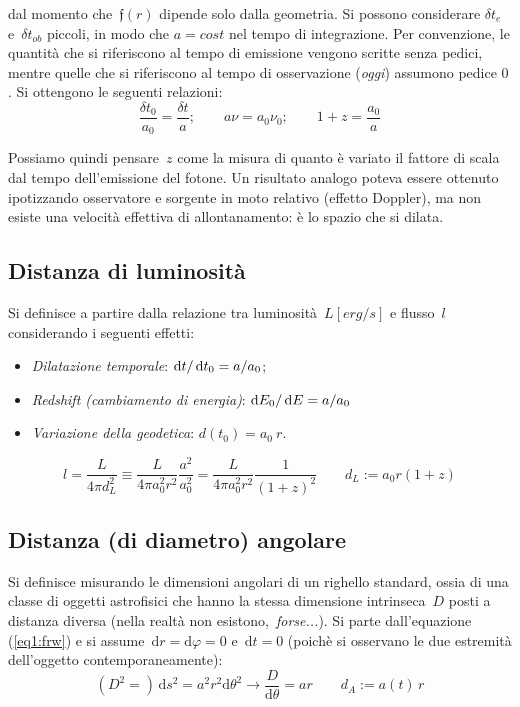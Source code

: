 dal momento che~\(\mathfrak{f}(r)\) dipende solo dalla geometria.
Si possono considerare \(\delta t_{e}\) e~\(\delta t_{ob}\) piccoli, in modo che \(a=cost\) nel tempo di integrazione. Per convenzione, le quantità che si riferiscono al tempo di emissione vengono scritte senza pedici, mentre quelle che si riferiscono al tempo di osservazione (\emph{oggi}) assumono pedice $0$. Si ottengono le seguenti relazioni:
\begin{equation}
\frac{\delta t_0}{a_0}=\frac{\delta t}{a};\qquad a\nu=a_0\nu_0;\qquad 1+z=\frac{a_0}{a}
\end{equation}

Possiamo quindi pensare~\(z\) come la misura di quanto è
variato il fattore di scala dal tempo dell'emissione del fotone. Un
risultato analogo poteva essere ottenuto ipotizzando osservatore e
sorgente in moto relativo (effetto Doppler), ma non esiste una velocità
effettiva di allontanamento: è lo spazio che si dilata.


\subsection{Distanza di luminosità}

Si definisce a partire dalla relazione tra luminosità~\(L [erg/s]\)
e flusso~\(l\) considerando i seguenti effetti:

\begin{itemize}
\item
  \emph{Dilatazione temporale}: $\operatorname{d}\!{t} / \operatorname{d}\!{t_0} = a / a_0$; 
\item
  \emph{Redshift (cambiamento di energia)}: $\operatorname{d}\!{E}_0 / \operatorname{d}\!{E} = a / a_0$
\item
  \emph{Variazione della geodetica}: $d(t_0) = a_0\: r$.
\end{itemize}
\begin{equation}
l=\frac{L}{4\pi d_L^2}\equiv\frac{L}{4\pi a_0^2r^2}\frac{a^2}{a_0^2}=\frac{L}{4\pi a_0^2r^2}\frac{1}{(1+z)^2}\qquad d_L := a_0 r (1+z)
\end{equation}

\subsection{Distanza (di diametro) angolare}

Si definisce misurando le dimensioni angolari di un righello standard,
ossia di una classe di oggetti astrofisici che hanno la stessa
dimensione intrinseca~\(D\) posti a distanza diversa (nella
realtà non esistono,~\emph{forse...}). Si parte dall'equazione (\ref{eq1:frw}) e si
assume~\(\mathrm{d}r=\mathrm{d}\varphi = 0\) e~\(\mathrm{d}t=0\) (poichè si osservano le
due estremità dell'oggetto contemporaneamente):
\begin{equation}
(D^2=)\, \mathrm{d}s^2=a^2r^2\mathrm{d}\theta^2\rightarrow \frac{D}{\mathrm{d}\theta}=ar\qquad d_A:=a(t)\, r
\end{equation}

